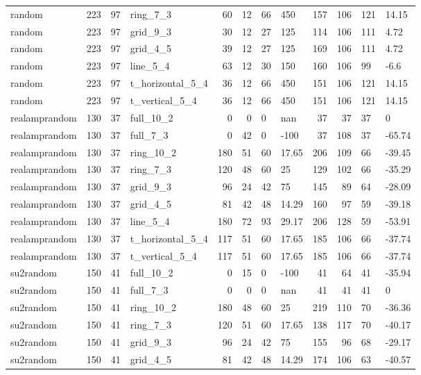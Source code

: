 \begin{longtable}{lrrlrrllrrll}
random & 223 & 97 & ring\_7\_3 & 60 & 12 & 66 & 450 & 157 & 106 & 121 & 14.15 \\
random & 223 & 97 & grid\_9\_3 & 30 & 12 & 27 & 125 & 114 & 106 & 111 & 4.72 \\
random & 223 & 97 & grid\_4\_5 & 39 & 12 & 27 & 125 & 169 & 106 & 111 & 4.72 \\
random & 223 & 97 & line\_5\_4 & 63 & 12 & 30 & 150 & 160 & 106 & 99 & -6.6 \\
random & 223 & 97 & t\_horizontal\_5\_4 & 36 & 12 & 66 & 450 & 151 & 106 & 121 & 14.15 \\
random & 223 & 97 & t\_vertical\_5\_4 & 36 & 12 & 66 & 450 & 151 & 106 & 121 & 14.15 \\
realamprandom & 130 & 37 & full\_10\_2 & 0 & 0 & 0 & nan & 37 & 37 & 37 & 0 \\
realamprandom & 130 & 37 & full\_7\_3 & 0 & 42 & 0 & -100 & 37 & 108 & 37 & -65.74 \\
realamprandom & 130 & 37 & ring\_10\_2 & 180 & 51 & 60 & 17.65 & 206 & 109 & 66 & -39.45 \\
realamprandom & 130 & 37 & ring\_7\_3 & 120 & 48 & 60 & 25 & 129 & 102 & 66 & -35.29 \\
realamprandom & 130 & 37 & grid\_9\_3 & 96 & 24 & 42 & 75 & 145 & 89 & 64 & -28.09 \\
realamprandom & 130 & 37 & grid\_4\_5 & 81 & 42 & 48 & 14.29 & 160 & 97 & 59 & -39.18 \\
realamprandom & 130 & 37 & line\_5\_4 & 180 & 72 & 93 & 29.17 & 206 & 128 & 59 & -53.91 \\
realamprandom & 130 & 37 & t\_horizontal\_5\_4 & 117 & 51 & 60 & 17.65 & 185 & 106 & 66 & -37.74 \\
realamprandom & 130 & 37 & t\_vertical\_5\_4 & 117 & 51 & 60 & 17.65 & 185 & 106 & 66 & -37.74 \\
su2random & 150 & 41 & full\_10\_2 & 0 & 15 & 0 & -100 & 41 & 64 & 41 & -35.94 \\
su2random & 150 & 41 & full\_7\_3 & 0 & 0 & 0 & nan & 41 & 41 & 41 & 0 \\
su2random & 150 & 41 & ring\_10\_2 & 180 & 48 & 60 & 25 & 219 & 110 & 70 & -36.36 \\
su2random & 150 & 41 & ring\_7\_3 & 120 & 51 & 60 & 17.65 & 138 & 117 & 70 & -40.17 \\
su2random & 150 & 41 & grid\_9\_3 & 96 & 24 & 42 & 75 & 155 & 96 & 68 & -29.17 \\
su2random & 150 & 41 & grid\_4\_5 & 81 & 42 & 48 & 14.29 & 174 & 106 & 63 & -40.57 \\

\end{longtable}
